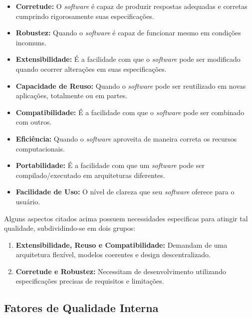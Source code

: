 \documentclass[a4paper, 12pt]{article}
\begin{document}
	 \begin{itemize}
	 	\item \textbf{Corretude:} O \textit{software} é capaz de produzir respostas adequadas e corretas cumprindo rigorosamente suas especificações.
	 	
	 	\item \textbf{Robustez:} Quando o \textit{software} é capaz de funcionar mesmo em condições incomuns.
	 	
	 	\item \textbf{Extensibilidade:} É a facilidade com que o \textit{software} pode ser modificado quando ocorrer alterações em suas especificações.
	 
		\item \textbf{Capacidade de Reuso:} Quando o \textit{software} pode ser reutilizado em novas aplicações, totalmente ou em partes.
		
		\item \textbf{Compatibilidade:} É a facilidade com que o \textit{software} pode ser combinado com outros.
		
		\item \textbf{Eficiência:} Quando o \textit{software} aproveita de maneira correta os recursos computacionais.
		
		\item \textbf{Portabilidade:} É a facilidade com que um \textit{software} pode ser compilado/executado em arquiteturas diferentes.
		
		\item \textbf{Facilidade de Uso:} O nível de clareza que seu \textit{software} oferece para o usuário.
	\end{itemize}

			Alguns aspectos citados acima possuem necessidades especificas para atingir tal qualidade, subdividindo-se em dois grupos:
	
	\begin{enumerate}
		\item \textbf{Extensibilidade, Reuso e Compatibilidade:} Demandam de uma arquitetura flexível, modelos coerentes e design descentralizado.
		
		\item \textbf{Corretude e Robustez:} Necessitam de desenvolvimento utilizando especificações precisas de requisitos e limitações.
	\end{enumerate}

	\subsection{Fatores de Qualidade Interna}
		
\end{document}

